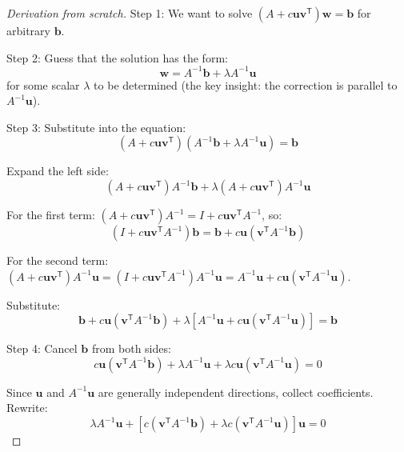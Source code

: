 \documentclass[11pt,a4paper]{article}
\theoremstyle{plain}
\theoremstyle{definition}
\newcommand{\vct}[1]{\mathbf{#1}}
\newcommand{\tr}{\mathsf{T}}
\begin{document}
\begin{proof}[Derivation from scratch]

Step 1: We want to solve $(A + c \vct{u} \vct{v}^\tr) \vct{w} = \vct{b}$ for arbitrary $\vct{b}$.

Step 2: Guess that the solution has the form:
\begin{equation}
\vct{w} = A^{-1}\vct{b} + \lambda A^{-1}\vct{u}
\end{equation}
for some scalar $\lambda$ to be determined (the key insight: the correction is parallel to $A^{-1}\vct{u}$).

Step 3: Substitute into the equation:
\begin{equation}
(A + c \vct{u} \vct{v}^\tr)(A^{-1}\vct{b} + \lambda A^{-1}\vct{u}) = \vct{b}
\end{equation}

Expand the left side:
\begin{equation}
(A + c \vct{u} \vct{v}^\tr)A^{-1}\vct{b} + \lambda(A + c \vct{u} \vct{v}^\tr)A^{-1}\vct{u}
\end{equation}

For the first term: $(A + c\vct{u}\vct{v}^\tr)A^{-1} = I + c\vct{u}\vct{v}^\tr A^{-1}$, so:
\begin{equation}
(I + c\vct{u}\vct{v}^\tr A^{-1})\vct{b} = \vct{b} + c\vct{u}(\vct{v}^\tr A^{-1}\vct{b})
\end{equation}

For the second term: $(A + c\vct{u}\vct{v}^\tr)A^{-1}\vct{u} = (I + c\vct{u}\vct{v}^\tr A^{-1})A^{-1}\vct{u} = A^{-1}\vct{u} + c\vct{u}(\vct{v}^\tr A^{-1}\vct{u})$.

Substitute:
\begin{equation}
\vct{b} + c\vct{u}(\vct{v}^\tr A^{-1}\vct{b}) + \lambda[A^{-1}\vct{u} + c\vct{u}(\vct{v}^\tr A^{-1}\vct{u})] = \vct{b}
\end{equation}

Step 4: Cancel $\vct{b}$ from both sides:
\begin{equation}
c\vct{u}(\vct{v}^\tr A^{-1}\vct{b}) + \lambda A^{-1}\vct{u} + \lambda c\vct{u}(\vct{v}^\tr A^{-1}\vct{u}) = 0
\end{equation}

Since $\vct{u}$ and $A^{-1}\vct{u}$ are generally independent directions, collect coefficients. Rewrite:
\begin{equation}
\lambda A^{-1}\vct{u} + [c(\vct{v}^\tr A^{-1}\vct{b}) + \lambda c(\vct{v}^\tr A^{-1}\vct{u})]\vct{u} = 0
\end{equation}


\end{proof}
\end{document}
